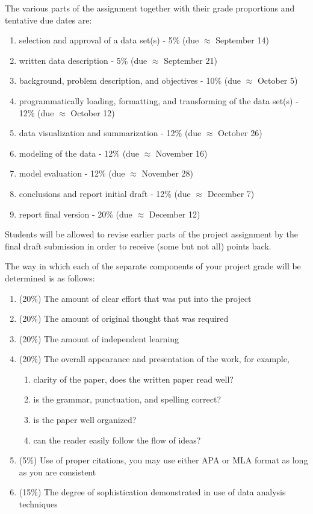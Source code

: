 \documentclass[12pt]{article}
\begin{document}
The various parts of the assignment together with their grade proportions and tentative due dates are:
\begin{enumerate}
    \item selection and approval of a data set(s) - 5\% (due $\approx$ September 14)
    \item written data description - 5\% (due $\approx$ September 21)
    \item background, problem description, and objectives - 10\% (due $\approx$ October 5)
    \item programmatically loading, formatting, and transforming of the data set(s) - 12\% (due $\approx$ October 12)
    \item data visualization and summarization - 12\% (due $\approx$ October 26)
    \item modeling of the data - 12\% (due $\approx$ November 16)
    \item model evaluation - 12\% (due $\approx$ November 28)
    \item conclusions and report initial draft - 12\% (due $\approx$ December 7)
    \item report final version - 20\%  (due $\approx$ December 12)
\end{enumerate}
Students will be allowed to revise earlier parts of the project assignment by the final draft submission in order to receive (some but not all) points back.

The way in which each of the separate components of your project grade will be determined is as follows:
\begin{enumerate}
  \item (20\%) The amount of clear effort that was put into the project
  \item (20\%) The amount of original thought that was required
  \item (20\%) The amount of independent learning
  \item (20\%) The overall appearance and presentation of the work, for example,
  \begin{enumerate}
    \item clarity of the paper, does the written paper read well?
    \item is the grammar, punctuation, and spelling correct?
    \item is the paper well organized?
    \item can the reader easily follow the flow of ideas?
  \end{enumerate}
  \item (5\%) Use of proper citations, you may use either APA or MLA format as long as you are consistent
  \item (15\%)  The degree of sophistication demonstrated in use of data analysis techniques
\end{enumerate}
\end{document}
